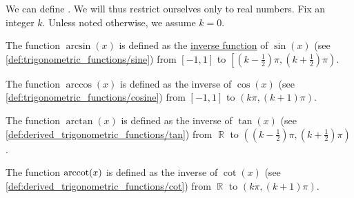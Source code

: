\begin{definition}\label{def:inverse_trigonometric_functions}
  We can define . We will thus restrict ourselves only to real numbers. Fix an integer \( k \). Unless noted otherwise, we assume \( k = 0 \).

  \begin{thmenum}
     The  function \( \arcsin(x) \) is defined as the \hyperref[def:set_valued_map/inverse]{inverse function} of \( \sin(x) \) (see \cref{def:trigonometric_functions/sine}) from \( [-1, 1] \) to \( \left[(k - \tfrac 1 2) \pi, (k + \tfrac 1 2) \pi \right) \).

     The  function \( \arccos(x) \) is defined as the inverse of \( \cos(x) \) (see \cref{def:trigonometric_functions/cosine}) from \( [-1, 1] \) to \( (k\pi, (k + 1)\pi) \).

     The  function \( \arctan(x) \) is defined as the inverse of \( \tan(x) \) (see \cref{def:derived_trigonometric_functions/tan}) from \( \BbbR \) to \( \left((k - \tfrac 1 2) \pi, (k + \tfrac 1 2) \pi \right) \).

     The  function \( \operatorname{arccot}(x) \) is defined as the inverse of \( \cot(x) \) (see \cref{def:derived_trigonometric_functions/cot}) from \( \BbbR \) to \( (k\pi, (k + 1)\pi) \).
  \end{thmenum}
\end{definition}

